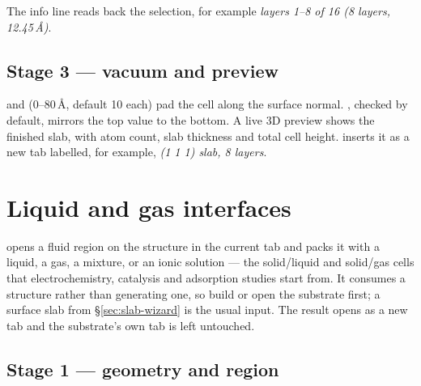 The info line reads back the selection, for example \emph{layers 1--8 of
16 (8 layers, 12.45\,\AA)}.

\subsection{Stage 3 --- vacuum and preview}

 and  (0--80\,\AA{}, default 10 each) pad
the cell along the surface normal. ,
checked by default, mirrors the top value to the bottom. A live 3D preview
shows the finished slab, with atom count, slab thickness and total cell
height.  inserts it as a new tab labelled, for example,
\emph{(1 1 1) slab, 8 layers}.

\section{Liquid and gas interfaces}
\label{sec:liquid-interface}

\menusep{} opens a fluid region on the
structure in the current tab and packs it with a liquid, a gas, a mixture, or
an ionic solution --- the solid/liquid and solid/gas cells that electro\-chem\-istry,
catalysis and adsorption studies start from. It consumes a structure rather
than generating one, so build or open the substrate first; a surface slab
from \S\ref{sec:slab-wizard} is the usual input. The result opens as a new
tab and the substrate's own tab is left untouched.

\subsection{Stage 1 --- geometry and region}

